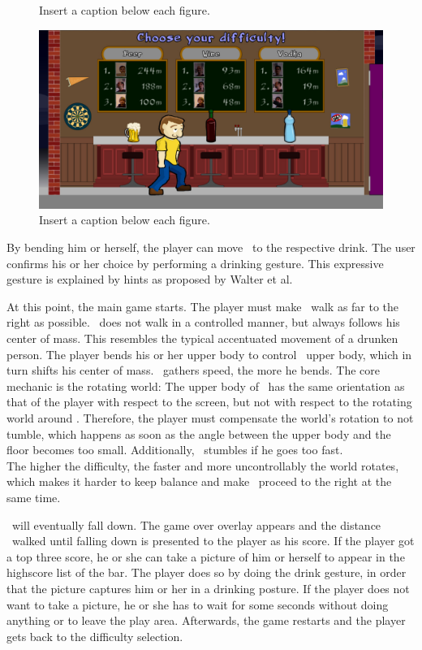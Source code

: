 {\begin{figure}
  \caption{Insert a caption below each figure.}
  \label{fig:screenshot3}
\end{figure}
\begin{figure}
  \centering
  \includegraphics[width=\linewidth]{pictures/screenshot2.jpg}
  \caption{Insert a caption below each figure.}
  \label{fig:screenshot4}
\end{figure}
}
By bending him or herself, the player can move \ed\ to the respective drink. The user confirms his or her choice by performing a drinking gesture. This expressive gesture is explained by hints as proposed by Walter et al. \cite{walter2013strikeapose}\lbreak

At this point, the main game starts. The player must make \ed\ walk as far to the right as possible. \ed\ does not walk in a controlled manner, but always follows his center of mass. This resembles the typical accentuated movement of a drunken person. The player bends his or her upper body to control \eds\ upper body, which in turn shifts his center of mass. \ed\ gathers speed, the more he bends. The core mechanic is the rotating world: The upper body of \ed\ has the same orientation as that of the player with respect to the screen, but not with respect to the rotating world around \ed. Therefore, the player must compensate the world's rotation to not tumble, which happens as soon as the angle between the upper body and the floor becomes too small. Additionally, \ed\ stumbles if he goes too fast.\\
The higher the difficulty, the faster and more uncontrollably the world rotates, which makes it harder to keep balance and make \ed\ proceed to the right at the same time.\lbreak

\ed\ will eventually fall down. The game over overlay appears and the distance \ed\ walked until falling down is presented to the player as his score. If the player got a top three score, he or she can take a picture of him or herself to appear in the highscore list of the bar. The player does so by doing the drink gesture, in order that the picture captures him or her in a drinking posture. If the player does not want to take a picture, he or she has to wait for some seconds without doing anything or to leave the play area. Afterwards, the game restarts and the player gets back to the difficulty selection.\lbreak

